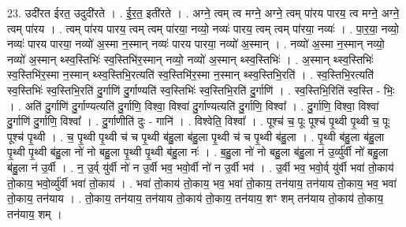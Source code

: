 \documentclass[17pt]{extarticle}
\begin{document}
23. उदी॑रत ईरत॒ उदुदी॑रते । . ई॒र॒त॒ इती॑रते । . अग्ने॒ त्वम् त्व मग्ने॒ अग्ने॒ त्वम् पा॑रय पारय॒ त्व मग्ने॒ अग्ने॒ त्वम् पा॑रय । . त्वम् पा॑रय पारय॒ त्वम् त्वम् पा॑रया॒ नव्यो॒ नव्यः॑ पारय॒ त्वम् त्वम् पा॑रया॒ नव्यः॑ । . पा॒र॒या॒ नव्यो॒ नव्यः॑ पारय पारया॒ नव्यो॑ अ॒स्मा न॒स्मान् नव्यः॑ पारय पारया॒ नव्यो॑ अ॒स्मान् । . नव्यो॑ अ॒स्मा न॒स्मान् नव्यो॒ नव्यो॑ अ॒स्मान् थ्स्व॒स्तिभिः॑ स्व॒स्तिभि॑र॒स्मान् नव्यो॒ नव्यो॑ अ॒स्मान् थ्स्व॒स्तिभिः॑ । . अ॒स्मान् थ्स्व॒स्तिभिः॑ स्व॒स्तिभि॑र॒स्मा न॒स्मान् थ्स्व॒स्तिभि॒रत्यति॑ स्व॒स्तिभि॑र॒स्मा न॒स्मान् थ्स्व॒स्तिभि॒रति॑ । . स्व॒स्तिभि॒रत्यति॑ स्व॒स्तिभिः॑ स्व॒स्तिभि॒रति॑ दु॒र्गाणि॑ दु॒र्गाण्यति॑ स्व॒स्तिभिः॑ स्व॒स्तिभि॒रति॑ दु॒र्गाणि॑ । . स्व॒स्तिभि॒रिति॑ स्व॒स्ति - भिः॒ । . अति॑ दु॒र्गाणि॑ दु॒र्गाण्यत्यति॑ दु॒र्गाणि॒ विश्वा॒ विश्वा॑ दु॒र्गाण्यत्यति॑ दु॒र्गाणि॒ विश्वा᳚ । . दु॒र्गाणि॒ विश्वा॒ विश्वा॑ दु॒र्गाणि॑ दु॒र्गाणि॒ विश्वा᳚ । . दु॒र्गाणीति॑ दुः - गानि॑ । . विश्वेति॒ विश्वा᳚ । . पूश्च॑ च॒ पूः पूश्च॑ पृ॒थ्वी पृ॒थ्वी च॒ पूः पूश्च॑ पृ॒थ्वी । . च॒ पृ॒थ्वी पृ॒थ्वी च॑ च पृ॒थ्वी ब॑हु॒ला ब॑हु॒ला पृ॒थ्वी च॑ च पृ॒थ्वी ब॑हु॒ला । . पृ॒थ्वी ब॑हु॒ला ब॑हु॒ला पृ॒थ्वी पृ॒थ्वी ब॑हु॒ला नो॑ नो बहु॒ला पृ॒थ्वी पृ॒थ्वी ब॑हु॒ला नः॑ । . ब॒हु॒ला नो॑ नो बहु॒ला ब॑हु॒ला न॑ उ॒र्व्यु॑र्वी नो॑ बहु॒ला ब॑हु॒ला न॑ उ॒र्वी । . न॒ उ॒र्व् यु॑र्वी नो॑ न उ॒र्वी भव॒ भवो॒र्वी नो॑ न उ॒र्वी भव॑ । . उ॒र्वी भव॒ भवो॒र्व् यु॑र्वी भवा॑ तो॒काय॑ तो॒काय॒ भवो॒र्व्यु॑र्वी भवा॑ तो॒काय॑ । . भवा॑ तो॒काय॑ तो॒काय॒ भव॒ भवा॑ तो॒काय॒ तन॑याय॒ तन॑याय तो॒काय॒ भव॒ भवा॑ तो॒काय॒ तन॑याय । . तो॒काय॒ तन॑याय॒ तन॑याय तो॒काय॑ तो॒काय॒ तन॑याय॒ शꣳ शम् तन॑याय तो॒काय॑ तो॒काय॒ तन॑याय॒ शम् । \newline
\end{document}
